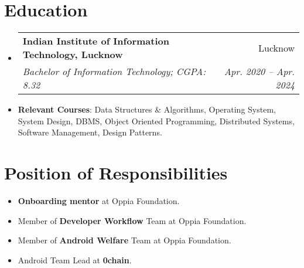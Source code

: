 \documentclass[letterpaper,1pt]{article}
\makeatletter
\newcommand{\resumeItem}[2]{
  \item\small{
    \textbf{#1}{: #2 \vspace{-2pt}}
  }
}
\newcommand{\resumeSubheading}[4]{
  \vspace{-1pt}\item
    \begin{tabular*}{0.97\textwidth}{l@{\extracolsep{\fill}}r}
      \textbf{#1} & #2 \\
      \textit{\small#3} & \textit{\small #4} \\
    \end{tabular*}\vspace{-5pt}
}
\newcommand{\resumeSubHeadingListStart}{\begin{itemize}[leftmargin=*]}
\newcommand{\resumeSubHeadingListEnd}{\end{itemize}}
\makeatother
\begin{document}
\section{Education}
\resumeSubHeadingListStart
\resumeSubheading
{Indian Institute of Information Technology, Lucknow}{Lucknow}
{Bachelor of Information Technology;  CGPA: 8.32}{Apr. 2020 -- Apr. 2024}
\resumeItem{Relevant Courses}{Data Structures \& Algorithms, Operating System, System Design, DBMS, Object Oriented Programming, Distributed Systems, Software Management, Design Patterns.}
\resumeSubHeadingListEnd

\section{Position of Responsibilities}
\begin{itemize}[leftmargin=*]
  \item \textbf{Onboarding mentor} at Oppia Foundation.
  \item Member of \textbf{Developer Workflow} Team at Oppia Foundation.
  \item Member of \textbf{Android Welfare} Team at Oppia Foundation.
  \item Android Team Lead at \textbf{0chain}.
\end{itemize}
\end{document}

